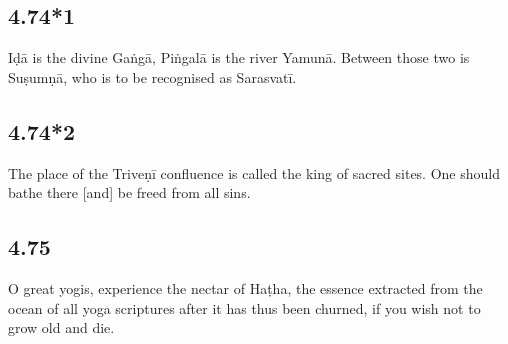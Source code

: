 \begin{ekdosis}

\subsection*{4.74*1}
\begin{translation}[hp04_074_1]
Iḍā is the divine Gaṅgā, Piṅgalā is the river Yamunā. Between those two is Suṣumṇā, who is to be recognised as Sarasvatī.
\end{translation}




\subsection*{4.74*2}
\begin{translation}[hp04_074_2]
The place of the Triveṇī confluence is called the king of sacred sites. One should bathe there [and] be freed from all sins.
\end{translation}




\subsection*{4.75}
\begin{translation}[hp04_075]
O great yogis, experience the nectar of Haṭha, the essence extracted from the ocean of all yoga scriptures after it has thus been churned, if you wish not to grow old and die.
\end{translation}


\end{ekdosis}
